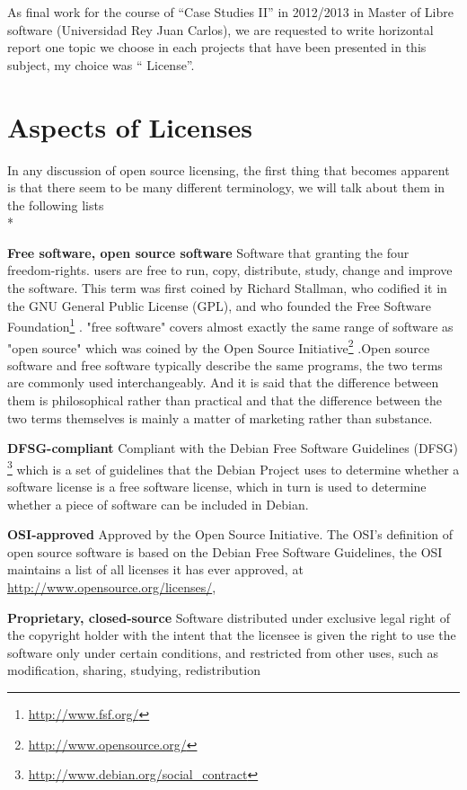\documentclass[11pt]{article} %
\begin{document}

\par As final work for the course of “Case Studies II” in 2012/2013 in Master of Libre software (Universidad Rey Juan Carlos), we are requested to write horizontal  report one topic we choose in each projects that have been presented in this subject,  my choice was “ License”.  
\section{Aspects of Licenses}

In any discussion of open source licensing, the first thing that becomes apparent is that there seem to be many different terminology, we will talk about them in the following lists
\\*

{\bf Free software, open source software} 
Software that granting the four freedom-rights. users are free to run, copy, distribute, study, change and improve the software.
This term was first coined by Richard Stallman, who codified it in the GNU General Public License (GPL), and who founded the Free Software Foundation\footnote{\url { http://www.fsf.org/}} . "free software" covers almost exactly the same range of software as "open source" which was coined by the Open Source Initiative\footnote{\url{http://www.opensource.org/}} .Open source software and free software typically describe the same programs, the two terms are commonly used interchangeably. And it is said that the difference between them is philosophical rather than practical and that the difference between the two terms themselves is mainly a matter of marketing rather than substance.

{\bf DFSG-compliant} 
Compliant with the Debian Free Software Guidelines (DFSG)  \footnote{\url{http://www.debian.org/social_contract}}
which is a set of guidelines that the Debian Project uses to determine whether a software license is a free software license, which in turn is used to determine whether a piece of software can be included in Debian.
  
{\bf OSI-approved} 
Approved by the Open Source Initiative. The OSI's definition of open source software is based on the Debian Free Software Guidelines,  the OSI maintains a list of all licenses it has ever approved, at \url {http://www.opensource.org/licenses/}, 

{\bf Proprietary, closed-source}
Software distributed under exclusive legal right of the copyright holder with the intent that the licensee is given the right to use the software only under certain conditions, and restricted from other uses, such as modification, sharing, studying, redistribution
\end{document}
